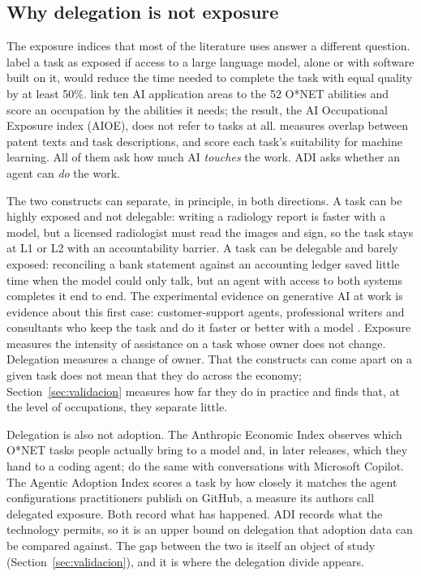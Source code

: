 \documentclass[preprint,12pt,authoryear]{elsarticle}
\begin{document}
\subsection{Why delegation is not exposure}
\label{sec:exposicion}

The exposure indices that most of the literature uses answer a different question.
\citet{eloundou2024gpts} label a task as exposed if access to a large language model, alone or with software built on it, would reduce the time needed to complete the task with equal quality by at least 50\%.
\citet{felten2021occupational} link ten AI application areas to the 52 O*NET abilities and score an occupation by the abilities it needs; the result, the AI Occupational Exposure index (AIOE), does not refer to tasks at all.
\citet{webb2020impact} measures overlap between patent texts and task descriptions, and \citet{brynjolfsson2018what} score each task's suitability for machine learning.
All of them ask how much AI \emph{touches} the work.
ADI asks whether an agent can \emph{do} the work.

The two constructs can separate, in principle, in both directions.
A task can be highly exposed and not delegable: writing a radiology report is faster with a model, but a licensed radiologist must read the images and sign, so the task stays at L1 or L2 with an accountability barrier.
A task can be delegable and barely exposed: reconciling a bank statement against an accounting ledger saved little time when the model could only talk, but an agent with access to both systems completes it end to end.
The experimental evidence on generative AI at work is evidence about this first case: customer-support agents, professional writers and consultants who keep the task and do it faster or better with a model \citep{brynjolfsson2023generative, noy2023experimental, dellacqua2023navigating}.
Exposure measures the intensity of assistance on a task whose owner does not change.
Delegation measures a change of owner.
That the constructs can come apart on a given task does not mean that they do across the economy; Section~\ref{sec:validacion} measures how far they do in practice and finds that, at the level of occupations, they separate little.

Delegation is also not adoption.
The Anthropic Economic Index \citep{aei2025economic, handa2025economic} observes which O*NET tasks people actually bring to a model and, in later releases, which they hand to a coding agent; \citet{tomlinson2025working} do the same with conversations with Microsoft Copilot.
The Agentic Adoption Index \citep{lee2026delegates} scores a task by how closely it matches the agent configurations practitioners publish on GitHub, a measure its authors call delegated exposure.
Both record what has happened.
ADI records what the technology permits, so it is an upper bound on delegation that adoption data can be compared against.
The gap between the two is itself an object of study (Section~\ref{sec:validacion}), and it is where the delegation divide appears.
\end{document}

